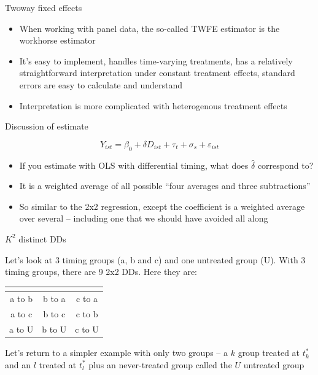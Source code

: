 \documentclass{beamer}
\begin{document}
\begin{frame}{Twoway fixed effects}

\begin{itemize}
\item When working with panel data, the so-called TWFE estimator is the workhorse estimator
\item It's easy to implement, handles time-varying treatments, has a relatively straightforward interpretation under constant treatment effects, standard errors are easy to calculate and understand
\item Interpretation is more complicated with heterogenous treatment effects
\end{itemize}

\end{frame}




\begin{frame}{Discussion of estimate}


$$Y_{ist} = \beta_0 + \delta D_{ist} + \tau_t + \sigma_s + \varepsilon_{ist}$$


\begin{itemize}
\item If you estimate with OLS with differential timing, what does $\widehat{\delta}$ correspond to?
\item It is a weighted average of all possible ``four averages and three subtractions'' 
\item So similar to the 2x2 regression, except the coefficient is a weighted average over several -- including one that we should have avoided all along

\end{itemize}

\end{frame}




\begin{frame}{$K^2$ distinct DDs}

Let's look at 3 timing groups (a, b and c) and one untreated group (U).  With 3 timing groups, there are 9 2x2 DDs.  Here they are:


\begin{center}
\begin{tabular}{c|c|c}
\multicolumn{1}{l}{} &
\multicolumn{1}{l}{} &
\multicolumn{1}{l}{} \\
\midrule
a to b & b to a & c to a \\
a to c & b to c & c to b \\
a to U & b to U & c to U \\
\midrule
\end{tabular}
\end{center}

\bigskip

Let's return to a simpler example with only two groups -- a $k$ group treated at $t_k^*$ and an $l$ treated at $t_l^*$ plus an never-treated group called the $U$ untreated group
\end{frame} 
\end{document}
